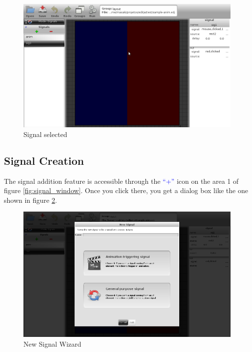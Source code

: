 \documentclass[a4paper]{profusion}
\newcommand{\GUIIcon}[1]{\textcolor{blue}{#1}}    %
\begin{document}
\begin{figure}
 \centering
 \includegraphics[width=1.0\textwidth]{./images/signal_list.png}
 \caption{Signal selected}
 \label{fig:signal_window_list}
\end{figure}

\subsection{Signal Creation}

The signal addition feature is accessible through the \GUIIcon{``+''}
icon on the area 1 of figure \ref{fig:signal_window}. Once you click
there, you get a dialog box like the one shown in figure
\ref{fig:signal_window_new}.

\begin{figure}
 \centering
 \includegraphics[width=1.0\textwidth]{./images/signal_new.png}
 \caption{New Signal Wizard}
 \label{fig:signal_window_new}
\end{figure}
\end{document}

